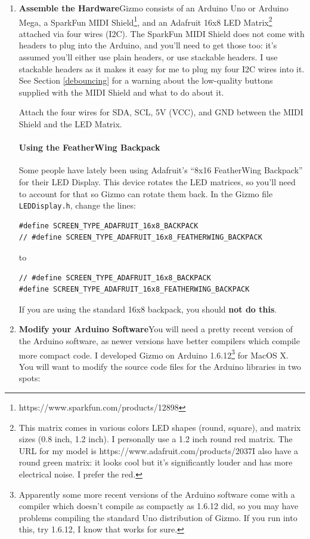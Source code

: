 \documentclass{article}
\begin{document}
\begin{enumerate}

\item {\bf Assemble the Hardware}\quad Gizmo consists of an Arduino Uno or Arduino Mega, a SparkFun MIDI Shield\footnote{https:/\!/www.sparkfun.com/products/12898}, and an Adafruit 16x8 LED Matrix\footnote{This matrix comes in various colors LED shapes (round, square), and matrix sizes (0.8 inch, 1.2 inch).  I personally use a 1.2 inch round red matrix.  The URL for my model is https:/\!/www.adafruit.com/products/2037\quad I also have a round green matrix: it looks cool but it's significantly louder and has more electrical noise.  I prefer the red.} attached via four wires (I2C).  The SparkFun MIDI Shield does not come with headers to plug into the Arduino, and you'll need to get those too: it's assumed you'll either use plain headers, or use stackable headers.  I use stackable headers as it makes it easy for me to plug my four I2C wires into it.  See Section \ref{debouncing} for a warning about the low-quality buttons supplied with the MIDI Shield and what to do about it.

Attach the four wires for SDA, SCL, 5V (VCC), and GND between the MIDI Shield and the LED Matrix.  

\paragraph{Using the FeatherWing Backpack} Some people have lately been using Adafruit's ``8x16 FeatherWing Backpack'' for their LED Display.  This device rotates the LED matrices, so you'll need to account for that so Gizmo can rotate them back.  In the Gizmo file \texttt{LEDDisplay.h}, change the lines:

\begin{verbatim}
#define SCREEN_TYPE_ADAFRUIT_16x8_BACKPACK
// #define SCREEN_TYPE_ADAFRUIT_16x8_FEATHERWING_BACKPACK
\end{verbatim}

to

\begin{verbatim}
// #define SCREEN_TYPE_ADAFRUIT_16x8_BACKPACK
#define SCREEN_TYPE_ADAFRUIT_16x8_FEATHERWING_BACKPACK
\end{verbatim}

If you are using the standard 16x8 backpack, you should {\bf not do this}.


\item {\bf Modify your Arduino Software}\quad You will need a pretty recent version of the Arduino software, as newer versions have better compilers which compile more compact code.  I developed Gizmo on Arduino 1.6.12\footnote{Apparently some more recent versions of the Arduino software come with a compiler which doesn't compile as compactly as 1.6.12 did, so you may have problems compiling the standard Uno distribution of Gizmo.  If you run into this, try 1.6.12, I know that works for sure.} for MacOS X.  You will want to modify the source code files for the Arduino libraries in two spots:


\end{enumerate}
\end{document}
